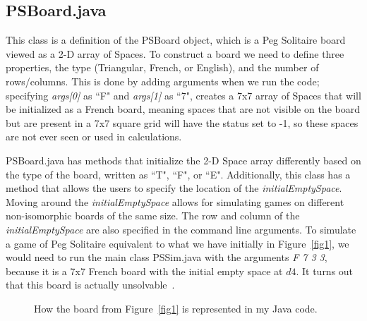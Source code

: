 \documentclass{article}
\begin{document}
\subsection{PSBoard.java}
\label{2.2PSBoard}
This class is a definition of the PSBoard object, which is a Peg Solitaire board viewed as a 2-D array of Spaces. To construct a board we need to define three properties, the type (Triangular, French, or English), and the number of rows/columns. This is done by adding arguments when we run the code; specifying \textit{args[0]} as ``F" and \textit{args[1]} as ``7", creates a 7x7 array of Spaces that will be initialized as a French board, meaning spaces that are not visible on the board but are present in a 7x7 square grid will have the status set to -1, so these spaces are not ever seen or used in calculations.

PSBoard.java has methods that initialize the 2-D Space array differently based on the type of the board, written as ``T", ``F", or ``E". Additionally, this class has a method that allows the users to specify the location of the \textit{initialEmptySpace}. Moving around the \textit{initialEmptySpace} allows for simulating games on different non-isomorphic boards of the same size. The row and column of the \textit{initialEmptySpace} are also specified in the command line arguments. To simulate a game of Peg Solitaire equivalent to what we have initially in Figure~\ref{fig1}, we would need to run the main class PSSim.java with the arguments \textit{F 7 3 3}, because it is a 7x7 French board with the initial empty space at $d4$. It turns out that this board is actually unsolvable~\cite{Brassine}.

\begin{figure}[htb]
\centering
{}
\hspace{.08\textwidth}
\caption{How the board from Figure~\ref{fig1} is represented in my Java code.}
\label{fig3}
\end{figure}
\end{document}
